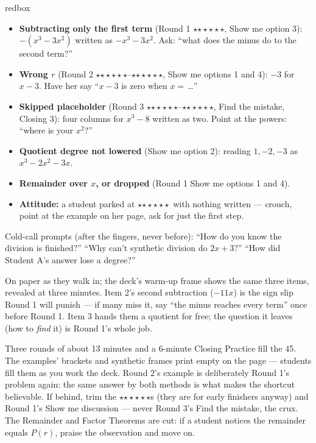 \documentclass[10pt]{article}
\newcommand{\rung}[1]{{\color{goldacc}\ifcase#1\or$\star$\or$\star\star$\or$\star\star\star$\fi}}
\begin{document}
\boxguard
\begin{skillbox}{redbox}
\begin{itemize}[leftmargin=1.2em, nosep]
  \item \textbf{Subtracting only the first term} (Round 1 \rung2, Show me option 3): $-(x^3 -
        3x^2)$ written as $-x^3 - 3x^2$. Ask: ``what does the minus do to the second term?''
  \item \textbf{Wrong $r$} (Round 2 \rung1--\rung2, Show me options 1 and 4): $-3$ for $x - 3$.
        Have her say ``$x - 3$ is zero when $x = $\,\dots''
  \item \textbf{Skipped placeholder} (Round 3 \rung1--\rung2, Find the mistake, Closing 3): four
        columns for $x^3 - 8$ written as two. Point at the powers: ``where is your $x^2$?''
  \item \textbf{Quotient degree not lowered} (Show me option 2): reading $1, -2, -3$ as
        $x^3 - 2x^2 - 3x$.
  \item \textbf{Remainder over $x$, or dropped} (Round 1 Show me options 1 and 4).
  \item \textbf{Attitude:} a student parked at \rung1\ with nothing written --- crouch, point at
        the example on her page, ask for just the first step.
\end{itemize}
Cold-call prompts (after the fingers, never before): ``How do you know the division is
finished?'' \;``Why can't synthetic division do $2x + 3$?'' \;``How did Student A's answer lose a
degree?''
\end{skillbox}

\boxguard[10]
\begin{teachernote}[Warm-Up]
On paper as they walk in; the deck's warm-up frame shows the same three items, revealed at three
minutes. Item 2's second subtraction ($-11x$) is the sign slip Round 1 will punish --- if many
miss it, say ``the minus reaches every term'' once before Round 1. Item 3 hands them a quotient
for free; the question it leaves (how to \emph{find} it) is Round 1's whole job.
\end{teachernote}

\boxguard[10]
\begin{teachernote}
Three rounds of about 13 minutes and a 6-minute Closing Practice fill the 45. The examples'
brackets and synthetic frames print empty on the page --- students fill them as you work the
deck. Round 2's example is deliberately Round 1's problem again: the same answer by both methods
is what makes the shortcut believable. If behind, trim the \rung3s (they are for early finishers
anyway) and Round 1's Show me discussion --- never Round 3's Find the mistake, the crux. The
Remainder and Factor Theorems are cut: if a student notices the remainder equals $P(r)$, praise
the observation and move on.
\end{teachernote}
\end{document}

